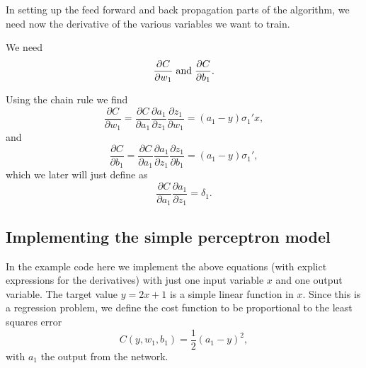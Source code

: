 \documentclass[%
oneside,                 %
final,                   %
10pt]{article}
\begin{document}
In setting up the feed forward and back propagation parts of the
algorithm, we need now the derivative of the various variables we want
to train.

We need
\[
\frac{\partial C}{\partial w_1} \hspace{0.1cm}\mathrm{and}\hspace{0.1cm}\frac{\partial C}{\partial b_1}. 
\]

Using the chain rule we find 
\[
\frac{\partial C}{\partial w_1}=\frac{\partial C}{\partial a_1}\frac{\partial a_1}{\partial z_1}\frac{\partial z_1}{\partial w_1}=(a_1-y)\sigma_1'x,
\]
and
\[
\frac{\partial C}{\partial b_1}=\frac{\partial C}{\partial a_1}\frac{\partial a_1}{\partial z_1}\frac{\partial z_1}{\partial b_1}=(a_1-y)\sigma_1',
\]
which we later will just define as
\[
\frac{\partial C}{\partial a_1}\frac{\partial a_1}{\partial z_1}=\delta_1.
\]

\subsection{Implementing the simple perceptron model}

In the example code here we implement the above equations (with explict
expressions for the derivatives) with just one input variable $x$ and
one output variable.  The target value $y=2x+1$ is a simple linear
function in $x$. Since this is a regression problem, we define the cost function to be proportional to the least squares error
\[
C(y,w_1,b_1)=\frac{1}{2}(a_1-y)^2,
\]
with $a_1$ the output from the network.
\end{document}
